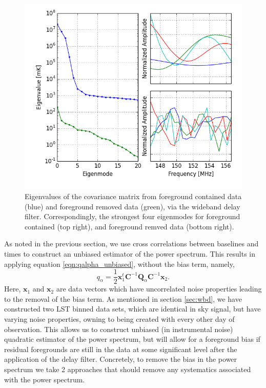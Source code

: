 \documentclass[twocolumn,numberedappendix]{emulateapj} \shorttitle{PSA64}
\newcommand{\x}{\mathbf{x}} \newcommand{\xhat}{\hat{\mathbf{x}}}
\begin{document}
\begin{figure}[t!]\centering
\includegraphics[width=1.5\columnwidth]{plots/eig.png}
\caption{Eigenvalues of the covariance matrix from foreground contained data
(blue) and foreground removed data (green), via the wideband delay filter.
Correspondingly, the strongest four eigenmodes for foreground contained (top
right), and foreground remved data (bottom right).}
\label{fig:eigs}
\end{figure}

As noted in the previous section, we use cross correlations between baselines
and times to construct an unbiased estimator of the power spectrum. This results
in applying equation \ref{eqn:qalpha_unbiased}, without the bias term, namely, 
\begin{equation}
\label{eqn:qalpha_nobias}
    q_{\alpha} =
        \frac{1}{2}\x_{1}^{t}\mathbf{C}^{-1}\mathbf{Q}_{\alpha}\mathbf{C}^{-1}\x_{2}.
\end{equation}
Here, $\x_{1}$ and $\x_{2}$ are data vectors which have uncorrelated noise
properties leading to the removal of the bias term. As mentioned in section
\ref{sec:wbd}, we have constructed two LST binned data sets, which are identical
in sky signal, but have varying noise properties, owning to being created with
every other day of observation.  This allows us to construct unbiased (in
instrumental noise) quadratic estimator of the power spectrum, but will allow
for a foreground bias if residual foregrounds are still in the data at some
significant level after the application of the delay filter. Concretely, to
remove the bias in the power spectrum we take 2 approaches that should remove
any systematics associated with the power spectrum.
\end{document}
